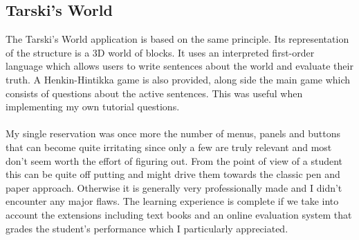 \documentclass{report}
\begin{document}
\subsection{Tarski's World}
The Tarski's World application is based on the same principle. Its representation of the structure is a 3D world of blocks. It uses an interpreted first-order language which allows users to write sentences about the world and evaluate their truth. A Henkin-Hintikka game is also provided, along side the main game which consists of questions about the active sentences. This was useful when implementing my own tutorial questions. \\ \\
My single reservation was once more the number of menus, panels and buttons that can become quite irritating since only a few are truly relevant and most don't seem worth the effort of figuring out. From the point of view of a student this can be quite off putting and might drive them towards the classic pen and paper approach. Otherwise it is generally very professionally made and I didn't encounter any major flaws. The learning experience is complete if we take into account the extensions including text books and an online evaluation system that grades the student's performance which I particularly appreciated.
\end{document}
